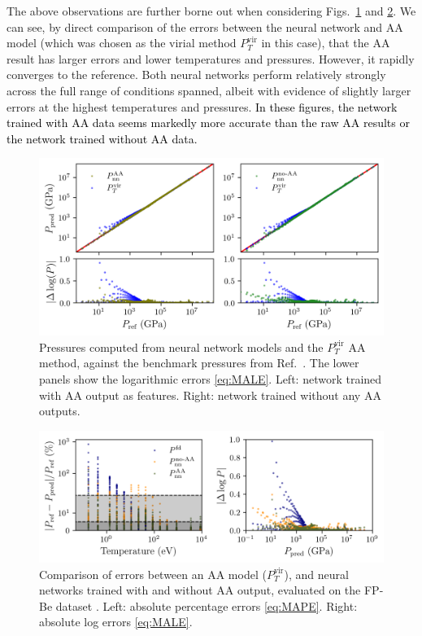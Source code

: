 \documentclass[%
 preprint,
 superscriptaddress,
 amsmath,amssymb,
longbibliography,
]{revtex4-2}
\newcommand{\change}[1]{\textcolor{black}{#1}}
\newcommand{\Pvirt}{P^\textrm{vir}_T}
\begin{document}
The above observations are further borne out when considering Figs.~\ref{fig:Be_log_nn_aa} and \ref{fig:err_aa_nn_comp_Be}. We can see, by direct comparison of the errors between the neural network and AA model (which was chosen as the virial method $\Pvirt$ in this case), that the AA result has larger errors and lower temperatures and pressures. However, it rapidly converges to the reference. Both neural networks perform relatively strongly across the full range of conditions spanned, albeit with evidence of slightly larger errors at the highest temperatures and pressures. \change{In these figures, the network trained with AA data seems markedly more accurate than the raw AA results or the network trained without AA data.}

\begin{figure}
    \centering
    \includegraphics{../figs/Be_log_nn_aa.png}
    \caption{Pressures computed from neural network models and the $\Pvirt$ AA method, against the benchmark pressures from Ref.~\cite{Hu_Be_EOS}. The lower panels show the logarithmic errors \eqref{eq:MALE}. Left: network trained with AA output as features. Right: network trained without any AA outputs.}
    \label{fig:Be_log_nn_aa}
\end{figure}



\begin{figure}
    \centering
    \includegraphics{../figs/aa_nn_errs_comp_Be.png}
    \caption{Comparison of errors between an AA model ($\Pvirt$), and neural networks trained with and without AA output, evaluated on the FP-Be dataset \cite{Hu_Be_EOS}. Left: absolute percentage errors \eqref{eq:MAPE}. Right: absolute log errors \eqref{eq:MALE}.}
    \label{fig:err_aa_nn_comp_Be}
\end{figure}
\end{document}

